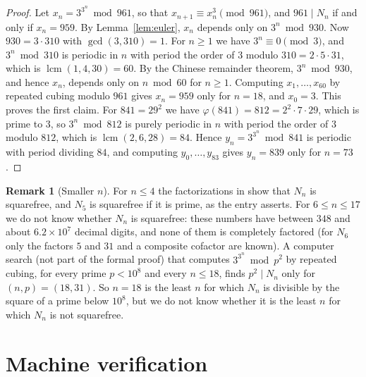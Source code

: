 \documentclass[11pt]{amsart}
\theoremstyle{plain}
\theoremstyle{definition}
\newtheorem{remark}[theorem]{Remark}
\begin{document}
\begin{proof}
Let $x_n=3^{3^n}\bmod961$, so that $x_{n+1}\equiv x_n^3\pmod{961}$, and $961\mid N_n$ if and only if $x_n=959$.
By Lemma~\ref{lem:euler}, $x_n$ depends only on $3^n\bmod930$.
Now $930=3\cdot310$ with $\gcd(3,310)=1$. For $n\ge1$ we have $3^n\equiv0\pmod 3$, and $3^n\bmod310$ is periodic in $n$ with period the order of $3$ modulo $310=2\cdot5\cdot31$, which is $\operatorname{lcm}(1,4,30)=60$.
By the Chinese remainder theorem, $3^n\bmod930$, and hence $x_n$, depends only on $n\bmod60$ for $n\ge1$.
Computing $x_1,\dots,x_{60}$ by repeated cubing modulo $961$ gives $x_n=959$ only for $n=18$, and $x_0=3$.
This proves the first claim.
For $841=29^2$ we have $\varphi(841)=812=2^2\cdot7\cdot29$, which is prime to $3$, so $3^n\bmod812$ is purely periodic in $n$ with period the order of $3$ modulo $812$, which is $\operatorname{lcm}(2,6,28)=84$. Hence $y_n=3^{3^n}\bmod841$ is periodic with period dividing $84$, and computing $y_0,\dots,y_{83}$ gives $y_n=839$ only for $n=73$.
\end{proof}

\begin{remark}[Smaller $n$]\label{rem:small}
For $n\le4$ the factorizations in  show that $N_n$ is squarefree, and $N_5$ is squarefree if it is prime, as the entry asserts.
For $6\le n\le17$ we do not know whether $N_n$ is squarefree: these numbers have between $348$ and about $6.2\times10^7$ decimal digits, and none of them is completely factored (for $N_6$ only the factors $5$ and $31$ and a composite cofactor are known).
A computer search (not part of the formal proof) that computes $3^{3^n}\bmod p^2$ by repeated cubing, for every prime $p<10^8$ and every $n\le18$, finds $p^2\mid N_n$ only for $(n,p)=(18,31)$.
So $n=18$ is the least $n$ for which $N_n$ is divisible by the square of a prime below $10^8$, but we do not know whether it is the least $n$ for which $N_n$ is not squarefree.
\end{remark}

\section{Machine verification}\label{sec:lean}
\end{document}
